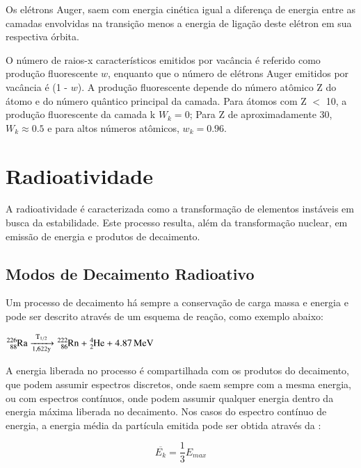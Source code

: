\documentclass[11pt,a4paper]{article}
\newcounter{exemplo}
\begin{document}
    Os elétrons Auger, saem com energia cinética igual a diferença de energia entre as camadas envolvidas na transição menos a energia de ligação deste elétron em sua respectiva órbita.


    O número de raios-x característicos emitidos por vacância é referido como produção fluorescente $w$, enquanto que o número de elétrons Auger emitidos por vacância é (1 - $w$). A produção fluorescente depende do número atômico Z do átomo e do número quântico principal da camada. Para átomos com Z $<$ 10, a produção fluorescente da camada k $W_k = 0$; Para Z de aproximadamente 30, $W_k \approx 0.5$ e para altos números atômicos, $w_k = 0.96$.


\section{Radioatividade}

    A radioatividade é caracterizada como a transformação de elementos instáveis em busca da estabilidade. Este processo resulta, além da transformação nuclear, em emissão de energia e produtos de decaimento.
        
        
\subsection*{Modos de Decaimento Radioativo}

    Um processo de decaimento há sempre a conservação de carga massa e energia e pode ser descrito através de um esquema de reação, como exemplo abaixo:

            \begin{center}
                $\ce{^{226}_{88}Ra ->[{T_{1/2}}][{1,622y}] ^{222}_{86}Rn + ^{4}_{2}He + 4.87 MeV}$
            \end{center}

    A energia liberada no processo é compartilhada com os produtos do decaimento, que podem assumir espectros discretos, onde saem sempre com a mesma energia, ou com espectros contínuos, onde podem assumir qualquer energia dentro da energia máxima liberada no decaimento. Nos casos do espectro contínuo de energia, a energia média da partícula emitida pode ser obtida através da :
            
                \begin{equation}
                    \overline{E_k} = \frac{1}{3} E_{max}
                \end{equation}
            
\end{document}
